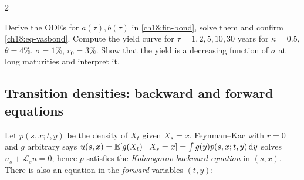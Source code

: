 \begin{paracol}{2}
\begin{exercise}\label{ch18:ex-vasbond}
Derive the ODEs for $a(\tau),b(\tau)$ in \cref{ch18:fin-bond}, solve them and confirm \eqref{ch18:eq-vasbond}. Compute the yield curve for $\tau=1,2,5,10,30$ years for $\kappa=0.5$, $\theta=4\%$, $\sigma=1\%$, $r_0=3\%$. Show that the yield is a decreasing function of $\sigma$ at long maturities and interpret it.
\end{exercise}

\subsection{Transition densities: backward and forward equations}
Let $p(s,x;t,y)$ be the density of $X_t$ given $X_s=x$. Feynman--Kac with $r=0$ and $g$ arbitrary says $u(s,x)=\mathbb{E}[g(X_t)\mid X_s=x]=\int g(y)p(s,x;t,y)\,\mathrm{d} y$ solves $u_s+\mathcal L_su=0$; hence $p$ satisfies the \emph{Kolmogorov backward equation} in $(s,x)$. There is also an equation in the \emph{forward} variables $(t,y)$:


\end{paracol}
